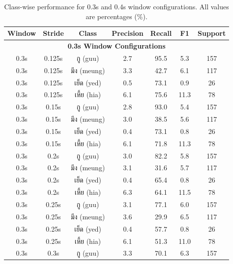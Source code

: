 \documentclass[11pt]{article}
\newcommand{\textthai}[1]{{\thaifont #1}}
\begin{document}
\begin{table}[H]
    \caption{Class-wise performance for 0.3s and 0.4s window configurations. All values are percentages (\%).}
    \centering
    \label{tab:class-performance-0.3-0.4}
    \scriptsize
    \setlength{\tabcolsep}{3pt}
    \begin{tabular}{|c|c|c|c|c|c|c|}
        \hline
        \textbf{Window} & \textbf{Stride} & \textbf{Class} & \textbf{Precision} & \textbf{Recall} & \textbf{F1} & \textbf{Support} \\
        \hline
        \multicolumn{7}{|c|}{\textbf{0.3s Window Configurations}} \\
        \hline
        0.3s & 0.125s & \textthai{กู} (guu) & 2.7 & 95.5 & 5.3 & 157 \\
        0.3s & 0.125s & \textthai{มึง} (meung) & 3.3 & 42.7 & 6.1 & 117 \\
        0.3s & 0.125s & \textthai{เย็ด} (yed) & 0.5 & 73.1 & 0.9 & 26 \\
        0.3s & 0.125s & \textthai{เหี้ย} (hia) & 6.1 & 75.6 & 11.3 & 78 \\
        \hline
        0.3s & 0.15s & \textthai{กู} (guu) & 2.8 & 93.0 & 5.4 & 157 \\
        0.3s & 0.15s & \textthai{มึง} (meung) & 3.0 & 38.5 & 5.6 & 117 \\
        0.3s & 0.15s & \textthai{เย็ด} (yed) & 0.4 & 73.1 & 0.8 & 26 \\
        0.3s & 0.15s & \textthai{เหี้ย} (hia) & 6.1 & 71.8 & 11.3 & 78 \\
        \hline
        0.3s & 0.2s & \textthai{กู} (guu) & 3.0 & 82.2 & 5.8 & 157 \\
        0.3s & 0.2s & \textthai{มึง} (meung) & 3.1 & 31.6 & 5.7 & 117 \\
        0.3s & 0.2s & \textthai{เย็ด} (yed) & 0.4 & 65.4 & 0.8 & 26 \\
        0.3s & 0.2s & \textthai{เหี้ย} (hia) & 6.3 & 64.1 & 11.5 & 78 \\
        \hline
        0.3s & 0.25s & \textthai{กู} (guu) & 3.1 & 77.1 & 6.0 & 157 \\
        0.3s & 0.25s & \textthai{มึง} (meung) & 3.6 & 29.9 & 6.5 & 117 \\
        0.3s & 0.25s & \textthai{เย็ด} (yed) & 0.4 & 57.7 & 0.8 & 26 \\
        0.3s & 0.25s & \textthai{เหี้ย} (hia) & 6.1 & 51.3 & 11.0 & 78 \\
        \hline
        0.3s & 0.3s & \textthai{กู} (guu) & 3.3 & 70.1 & 6.3 & 157 \\

\end{tabular}
\end{table}
\end{document}
